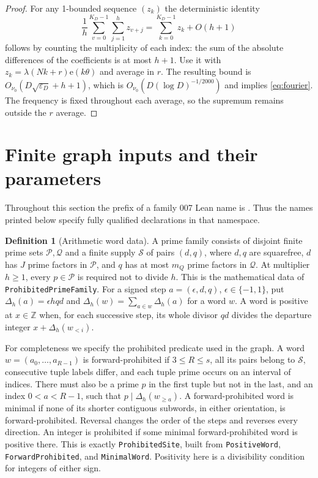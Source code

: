 \documentclass[11pt]{article}
\theoremstyle{definition}
\newtheorem{definition}[theorem]{Definition}
\newcommand{\e}{\mathrm e}
\newcommand{\Z}{\mathbb Z}
\newcommand{\leanname}[1]{\nolinkurl{#1}}
\begin{document}
\begin{proof}
For any 1-bounded sequence $(z_k)$ the deterministic identity
\[
 \frac1h\sum_{v=0}^{K_D-1}\sum_{j=1}^h z_{v+j}
 =\sum_{k=0}^{K_D-1}z_k+O(h+1)
\]
follows by counting the multiplicity of each index: the sum of the
absolute differences of the coefficients is at most $h+1$.
Use it with $z_k=\lambda(Nk+r)\e(k\theta)$ and average in $r$.
The resulting bound is
$O_{\nu_0}(D\sqrt{\varepsilon_D}+h+1)$, which is
$O_{\nu_0}(D(\log D)^{-1/2000})$ and implies \eqref{eq:fourier}.
The frequency is fixed throughout each average, so the supremum remains
outside the $r$ average.
\end{proof}

\section{Finite graph inputs and their parameters}
Throughout this section the prefix of a family 007 Lean name is
. Thus the names printed below specify
fully qualified declarations in that namespace.

\begin{definition}[Arithmetic word data]\label{def:words}
A prime family consists of disjoint finite prime sets $\mathcal P,
\mathcal Q$ and a finite supply $\mathcal S$ of pairs $(d,q)$, where $d,q$
are squarefree, $d$ has $J$ prime factors in $\mathcal P$, and $q$ has at
most $m_Q$ prime factors in $\mathcal Q$. At multiplier $h\ge1$, every
$p\in\mathcal P$ is required not to divide $h$.
This is the mathematical data of \leanname{ProhibitedPrimeFamily}.
For a signed step $a=(\epsilon,d,q)$, $\epsilon\in\{-1,1\}$, put
$\Delta_h(a)=\epsilon hqd$ and
$\Delta_h(w)=\sum_{a\in w}\Delta_h(a)$ for a word $w$.
A word is positive at $x\in\Z$ when, for each successive step, its whole
divisor $qd$ divides the departure integer $x+\Delta_h(w_{<i})$.
\end{definition}

For completeness we specify the prohibited predicate used in the graph.
A word $w=(a_0,\ldots,a_{R-1})$ is forward-prohibited if
$3\le R\le s$, all its pairs belong to $\mathcal S$, consecutive tuple
labels differ, and each tuple prime occurs on an interval of indices.
There must also be a prime $p$ in the first tuple but not in the last,
and an index $0<a<R-1$, such that
$p\mid\Delta_h(w_{\ge a})$.
A forward-prohibited word is minimal if none of its shorter contiguous
subwords, in either orientation, is forward-prohibited. Reversal changes
the order of the steps and reverses every direction.
An integer is prohibited if some minimal forward-prohibited word is
positive there. This is exactly \leanname{ProhibitedSite}, built from
\leanname{PositiveWord}, \leanname{ForwardProhibited}, and
\leanname{MinimalWord}. Positivity here is a divisibility condition for
integers of either sign.
\end{document}
